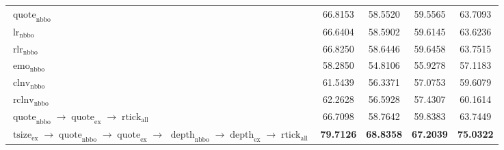 \begin{table}[H]
\begin{tabular}{@{}p{5.7cm}SSSS@{}}
        $\operatorname{quote}_{\mathrm{nbbo}}$                                                                                                                                                                                                                 & 66.8153                      & 58.5520           & 59.5565           & 63.7093           \\
        $\operatorname{lr}_{\mathrm{nbbo}}$                                                                                                                                                                                                                    & 66.6404                      & 58.5902           & 59.6145           & 63.6236           \\
        $\operatorname{rlr}_{\mathrm{nbbo}}$                                                                                                                                                                                                                   & 66.8250                      & 58.6446           & 59.6458           & 63.7515           \\
        $\operatorname{emo}_{\mathrm{nbbo}}$                                                                                                                                                                                                                   & 58.2850                      & 54.8106           & 55.9278           & 57.1183           \\
        $\operatorname{clnv}_{\mathrm{nbbo}}$                                                                                                                                                                                                                  & 61.5439                      & 56.3371           & 57.0753           & 59.6079           \\
        $\operatorname{rclnv}_{\mathrm{nbbo}}$                                                                                                                                                                                                                 & 62.2628                      & 56.5928           & 57.4307           & 60.1614           \\ \midrule
        $\operatorname{quote}_{\mathrm{nbbo}} \to \operatorname{quote}_{\mathrm{ex}} \to \operatorname{rtick}_{\mathrm{all}}$                                                                                                                                  & 66.7098                      & 58.7642           & 59.8383           & 63.7449           \\
         & \bfseries 79.7126            & \bfseries 68.8358 & \bfseries 67.2039 & \bfseries 75.0322 \\
        \bottomrule
    \end{tabular}
\end{table}

